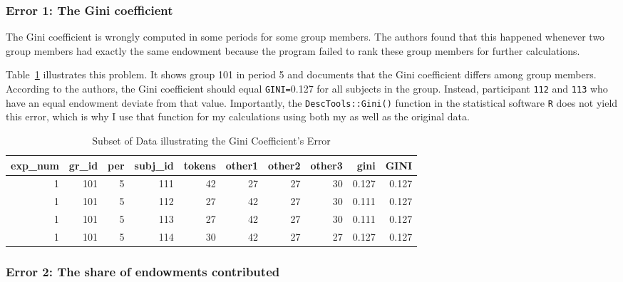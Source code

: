\documentclass[
  authoryear,
  review,
  3p,
  onecolumn]{elsarticle}
\begin{document}
\hypertarget{error-1-the-gini-coefficient}{%
\subsubsection{Error 1: The Gini
coefficient}\label{error-1-the-gini-coefficient}}

The Gini coefficient is wrongly computed in some periods for some group
members. The authors found that this happened whenever two group members
had exactly the same endowment because the program failed to rank these
group members for further calculations.

Table~\ref{tbl-gini-error} illustrates this problem. It shows group 101
in period 5 and documents that the Gini coefficient differs among group
members. According to the authors, the Gini coefficient should equal
\texttt{GINI=}0.127 for all subjects in the group. Instead, participant
\texttt{112} and \texttt{113} who have an equal endowment deviate from
that value. Importantly, the \texttt{DescTools::Gini()} function in the
statistical software \texttt{R} does not yield this error, which is why
I use that function for my calculations using both my as well as the
original data.

\hypertarget{tbl-gini-error}{}
\begin{table}
\caption{\label{tbl-gini-error}Subset of Data illustrating the Gini Coefficient's Error }\tabularnewline

\centering
\begin{tabular}{r|r|r|r|r|r|r|r|r|r}
\hline
exp\_num & gr\_id & per & subj\_id & tokens & other1 & other2 & other3 & gini & GINI\\
\hline
1 & 101 & 5 & 111 & 42 & 27 & 27 & 30 & 0.127 & 0.127\\
\hline
1 & 101 & 5 & 112 & 27 & 42 & 27 & 30 & 0.111 & 0.127\\
\hline
1 & 101 & 5 & 113 & 27 & 42 & 27 & 30 & 0.111 & 0.127\\
\hline
1 & 101 & 5 & 114 & 30 & 42 & 27 & 27 & 0.127 & 0.127\\
\hline
\end{tabular}
\end{table}

\hypertarget{error-2-the-share-of-endowments-contributed}{%
\subsubsection{Error 2: The share of endowments
contributed}\label{error-2-the-share-of-endowments-contributed}}
\end{document}
